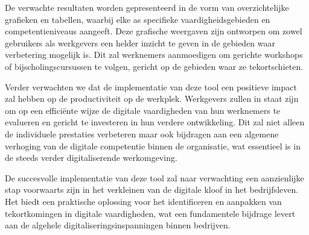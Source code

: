 De verwachte resultaten worden gepresenteerd in de vorm van overzichtelijke grafieken en tabellen, waarbij elke as specifieke vaardigheidsgebieden en competentieniveaus aangeeft. Deze grafische weergaven zijn ontworpen om zowel gebruikers als werkgevers een helder inzicht te geven in de gebieden waar verbetering mogelijk is. Dit zal werknemers aanmoedigen om gerichte workshops of bijscholingscursussen te volgen, gericht op de gebieden waar ze tekortschieten.

Verder verwachten we dat de implementatie van deze tool een positieve impact zal hebben op de productiviteit op de werkplek. Werkgevers zullen in staat zijn om op een efficiënte wijze de digitale vaardigheden van hun werknemers te evalueren en gericht te investeren in hun verdere ontwikkeling. Dit zal niet alleen de individuele prestaties verbeteren maar ook bijdragen aan een algemene verhoging van de digitale competentie binnen de organisatie, wat essentieel is in de steeds verder digitaliserende werkomgeving.

De succesvolle implementatie van deze tool zal naar verwachting een aanzienlijke stap voorwaarts zijn in het verkleinen van de digitale kloof in het bedrijfsleven. Het biedt een praktische oplossing voor het identificeren en aanpakken van tekortkomingen in digitale vaardigheden, wat een fundamentele bijdrage levert aan de algehele digitaliseringsinspanningen binnen bedrijven.
